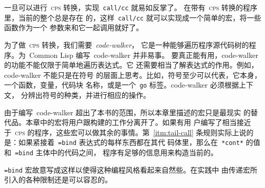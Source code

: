 一旦可以进行~\textsc{cps} 转换，实现~\texttt{call/cc} 就易如反掌了。
在带有~\textsc{cps} 转换的程序里，当前的整个\continuation{}总是存在
的，这样~\texttt{call/cc} 就可以实现成一个简单的宏，将一些函数作为一个
参数来和它一起调用就好了。

为了做~\textsc{cps} 转换，我们需要~\emph{code-walker}\label{expl:code-walker}，
它是一种能够遍历程序源代码树的程序。为~Common Lisp 编写~code-walker 并非易事。
要真正能有用，code-walker 的功能不能仅限于简单地遍历表达式。它
还需要相当了解表达式的作用。例如，code-walker 不能只是在符号
的层面上思考。比如，符号至少可以代表，它本身，一个函数，变量，代码块
名称，或是一个~\texttt{go} 标签。code-walker 必须根据上下文，
分辨出符号的种类，并进行相应的操作。

由于编写~code-walker 超出了本书的范围，所以本章里描述的宏只是最现实
的替代品。本章中的宏将用户跟构建\continuation{}的工作分离开了。如果有用
户编写了相当接近于~\textsc{cps} 的程序，这些宏可以做其余的事情。第~\ref{itm:tail-call}
条规则实际上说的是：如果紧接着~\texttt{=bind} 表达式的每样东西都在其代
码体里，那么在~\texttt{*cont*} 的值和~\texttt{=bind} 主体中的代码之间，
程序有足够的信息用来构造当前的\continuation{}。

\texttt{=bind} 宏故意写成这样以使得这种编程风格看起来自然些。在实践中
由\continuation{}传递宏所引入的各种限制还是可以容忍的。

